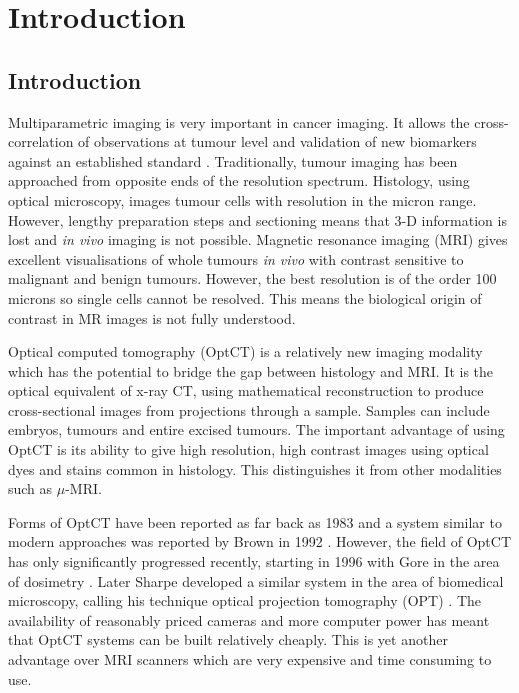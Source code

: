 \chapter{Introduction}

\section{Introduction}
\label{sec:intro}

Multiparametric imaging is very important in cancer imaging. It allows the cross-correlation of observations at tumour level and  validation of new biomarkers against an established standard \cite{Padhani:2010hfa}. 
Traditionally, tumour imaging has been approached from opposite ends of the resolution spectrum. Histology, using optical microscopy,  images tumour cells with resolution in the micron range. However, lengthy preparation steps and sectioning means that 3-D information is lost and \textit{in vivo} imaging is not possible. Magnetic resonance imaging (MRI) gives excellent visualisations of whole tumours \textit{in vivo} with contrast sensitive to malignant and benign tumours. However, the best resolution is of the order 100 microns so single cells cannot be resolved. This means the biological origin of contrast in MR images is not fully understood. 

Optical computed tomography (OptCT) is a relatively new imaging modality which has the potential to bridge the gap between histology and MRI. It is the optical equivalent of x-ray CT, using mathematical reconstruction to produce cross-sectional images from projections through a sample. Samples can include embryos, tumours and entire excised tumours. The important advantage of using OptCT is its ability to give high resolution, high contrast images using optical dyes and stains common in histology. This distinguishes it from other modalities such as $\mu$-MRI.

Forms of OptCT have been reported as far back as 1983 \cite{ray1983laser,kawata1990laser} %
and a system similar to modern approaches was reported by Brown in 1992 \cite{Brown:1992}. 
However, the field of OptCT has only significantly  progressed recently, starting in 1996 with Gore in the area of dosimetry  \cite{Gore:1999tg}. Later Sharpe developed a similar system in the area of biomedical microscopy, calling his technique optical projection tomography (OPT)  \cite{Sharpe:2002jp}. The availability of reasonably priced cameras and more computer power has meant that OptCT systems can be built relatively cheaply. This is yet another advantage over MRI scanners which are very expensive and time consuming to use.


